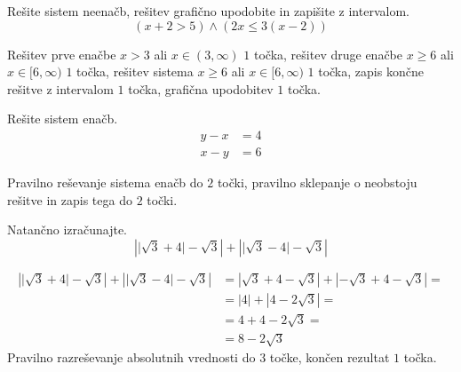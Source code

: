 \documentclass[addpoints]{exam}
\begin{document}
\begin{questions}
        
    \newpage 

    \question[5]
    Rešite sistem neenačb, rešitev grafično upodobite in zapišite z intervalom.
    $$ \left(x+2>5\right)\land\left(2x\leq 3(x-2)\right) $$
    
    
    \begin{solution}[11cm]
        Rešitev prve enačbe $x>3$ ali $x\in(3,\infty)$ $1$ točka, rešitev druge enačbe $x\geq 6$ ali $x\in[6,\infty)$ $1$ točka, rešitev sistema $x\geq 6$ ali $x\in[6,\infty)$ $1$ točka, zapis končne rešitve z intervalom $1$ točka, grafična upodobitev $1$ točka.
    \end{solution}




    \question[4]
    Rešite sistem enačb.
    $$ \begin{aligned}
        y-x&=4 \\ x-y&=6
    \end{aligned} $$
    
    
    \begin{solution}[8cm]
        Pravilno reševanje sistema enačb do $2$ točki, pravilno sklepanje o neobstoju rešitve in zapis tega do $2$ točki.
    \end{solution}



    
    




    \newpage 

    
    \question[4]
    Natančno izračunajte.
    $$ \left\lvert \lvert\sqrt{3}+4\rvert-\sqrt{3}\right\rvert + \left\lvert \lvert\sqrt{3}-4\rvert-\sqrt{3}\right\rvert $$
    
    
    
    \begin{solution}[10cm]
        \begin{align*}
            \left\lvert \lvert\sqrt{3}+4\rvert-\sqrt{3}\right\rvert + \left\lvert \lvert\sqrt{3}-4\rvert-\sqrt{3}\right\rvert &=
            \left\lvert \sqrt{3}+4-\sqrt{3}\right\rvert + \left\lvert -\sqrt{3}+4-\sqrt{3}\right\rvert= \\
            &= \left\lvert 4\right\rvert + \left\lvert 4-2\sqrt{3}\right\rvert= \\
            &= 4+4-2\sqrt{3}= \\
            &= 8-2\sqrt{3}
        \end{align*}
        Pravilno razreševanje absolutnih vrednosti do $3$ točke, končen rezultat $1$ točka.
    \end{solution}





\end{questions}
\end{document}
